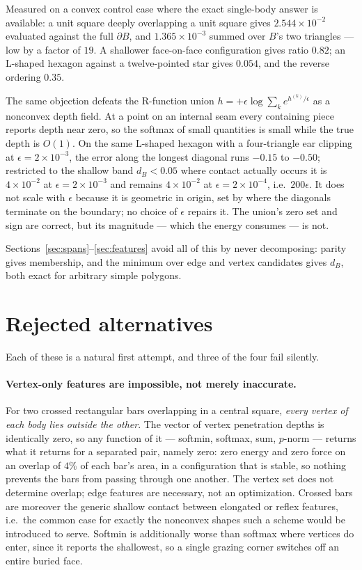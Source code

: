 \documentclass[11pt]{article}
\begin{document}
Measured on a convex control case where the exact single-body answer is available: a unit square deeply overlapping a unit square gives $2.544\times10^{-2}$ evaluated against the full $\partial B$, and $1.365\times10^{-3}$ summed over $B$'s two triangles --- low by a factor of $19$. A shallower face-on-face configuration gives ratio $0.82$; an L-shaped hexagon against a twelve-pointed star gives $0.054$, and the reverse ordering $0.35$.

The same objection defeats the R-function union $h = +\epsilon\log\sum_k e^{h^{(k)}/\epsilon}$ as a nonconvex depth field. At a point on an internal seam every containing piece reports depth near zero, so the softmax of small quantities is small while the true depth is $O(1)$. On the same L-shaped hexagon with a four-triangle ear clipping at $\epsilon = 2\times10^{-3}$, the error along the longest diagonal runs $-0.15$ to $-0.50$; restricted to the shallow band $d_B<0.05$ where contact actually occurs it is $4\times10^{-2}$ at $\epsilon = 2\times10^{-3}$ and remains $4\times10^{-2}$ at $\epsilon = 2\times10^{-4}$, i.e.\ $200\epsilon$. It does not scale with $\epsilon$ because it is geometric in origin, set by where the diagonals terminate on the boundary; no choice of $\epsilon$ repairs it. The union's zero set and sign are correct, but its magnitude --- which the energy consumes --- is not.

Sections~\ref{sec:spans}--\ref{sec:features} avoid all of this by never decomposing: parity gives membership, and the minimum over edge and vertex candidates gives $d_B$, both exact for arbitrary simple polygons.

\section{Rejected alternatives}
\label{sec:rejected}

Each of these is a natural first attempt, and three of the four fail silently.

\paragraph{Vertex-only features are impossible, not merely inaccurate.} For two crossed rectangular bars overlapping in a central square, \emph{every vertex of each body lies outside the other}. The vector of vertex penetration depths is identically zero, so any function of it --- softmin, softmax, sum, $p$-norm --- returns what it returns for a separated pair, namely zero: zero energy and zero force on an overlap of $4\%$ of each bar's area, in a configuration that is stable, so nothing prevents the bars from passing through one another. The vertex set does not determine overlap; edge features are necessary, not an optimization. Crossed bars are moreover the generic shallow contact between elongated or reflex features, i.e.\ the common case for exactly the nonconvex shapes such a scheme would be introduced to serve. Softmin is additionally worse than softmax where vertices do enter, since it reports the shallowest, so a single grazing corner switches off an entire buried face.
\end{document}
